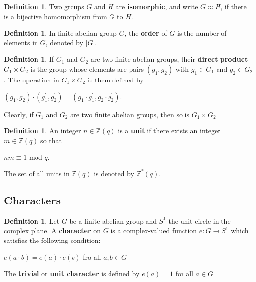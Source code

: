 \documentclass[psamsfonts]{amsart}
\theoremstyle{definition}
\newtheorem{defn}[thm]{Definition}
\theoremstyle{remark}
\numberwithin{equation}{section}
\begin{document}
			\begin{defn}
				Two groups $G$ and $H$ are \textbf{isomorphic}, and write $G \approx H$, if there is a bijective homomorphism from $G$ to $H$.
			\end{defn}
			
			\begin{defn}
				In finite abelian group $G$, the \textbf{order} of $G$ is the number of elements in $G$, denoted by $|G|$.
			\end{defn}
			
			\begin{defn}
				If $G_1$ and $G_2$ are two finite abelian groups, their \textbf{direct product} $G_1 \times G_2$ is the group whose elements are pairs $(g_1,g_2)$ with $g_1 \in G_1$ and $g_2 \in G_2$. The operation in $G_1 \times G_2$ is them defined by\\
				\begin{center}
					$(g_1,g_2) \cdot (g_1^{\prime}, g_2^{\prime}) = (g_1 \cdot g_1^{\prime} , g_2 \cdot g_2^{\prime})$.
				\end{center}
			\end{defn}
			
			\vspace{2mm}
			
			Clearly, if $G_1$ and $G_2$ are two finite abelian groups, then so is $G_1 \times G_2$
			
			\begin{defn}
				An integer $n \in \mathbb{Z}(q)$ is a \textbf{unit} if there exists an integer $m \in \mathbb{Z}(q)$ so that\\
				\begin{center}
					$nm \equiv 1$ \hspace{3mm} mod $q$.
				\end{center}
				\vspace{2mm}		 						
				The set of all units in $\mathbb{Z}(q)$ is denoted by $\mathbb{Z}^*(q)$.
			\end{defn}
			
		\subsection{Characters}
			\begin{defn}
				Let $G$ be a finite abelian group and $S^1$ the unit circle in the complex plane. A \textbf{character} on $G$ is a complex-valued function $e : G \rightarrow S^1$ which satisfies the following condition:\\
				\begin{center}
					$e(a \cdot b) = e(a) \cdot e(b)$ \hspace{3mm} fro all $a,b \in G$
				\end{center}
				The \textbf{trivial} or \textbf{unit character} is defined by $e(a) = 1$ for all $a \in G$
			\end{defn}
			
\end{document}
